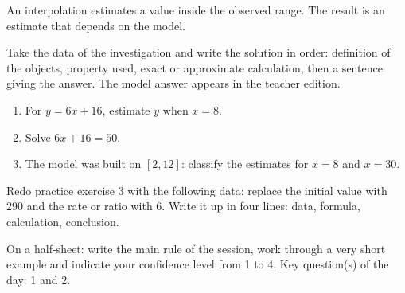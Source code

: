 \begin{traceecrite}An interpolation estimates a value inside the observed range. The result is an estimate that depends on the model.\end{traceecrite}

\begin{exemple}
Take the data of the investigation and write the solution in order: definition of the objects, property used, exact or approximate calculation, then a sentence giving the answer. The model answer appears in the teacher edition.
\end{exemple}

\begin{exercice}[-- essential]
\begin{enumerate}\item For $y=6x+16$, estimate $y$ when $x=8$.\item Solve $6x+16=50$.\item The model was built on $[2,12]$: classify the estimates for $x=8$ and $x=30$.\end{enumerate}
\end{exercice}


\begin{dm}Redo practice exercise 3 with the following data: replace the initial value with $290$ and the rate or ratio with $6$. Write it up in four lines: data, formula, calculation, conclusion.\end{dm}

\begin{sortie}On a half-sheet: write the main rule of the session, work through a very short example and indicate your confidence level from 1 to 4. Key question(s) of the day: 1 and 2.\end{sortie}

